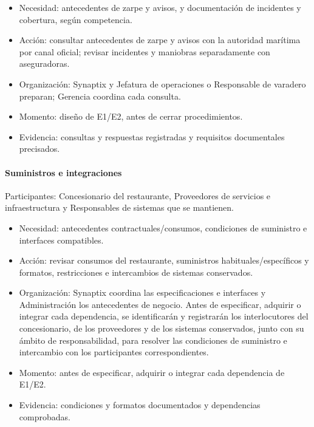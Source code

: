\begin{itemize}
  \setlength{\itemsep}{2pt}
  \setlength{\parsep}{0pt}
  \item Necesidad: antecedentes de zarpe y avisos, y documentación de incidentes y cobertura, según competencia.
  \item Acción: consultar antecedentes de zarpe y avisos con la autoridad marítima por canal oficial; revisar incidentes y maniobras separadamente con aseguradoras.
  \item Organización: Synaptix y Jefatura de operaciones o Responsable de varadero preparan; Gerencia coordina cada consulta.
  \item Momento: diseño de E1/E2, antes de cerrar procedimientos.
  \item Evidencia: consultas y respuestas registradas y requisitos documentales precisados.
\end{itemize}

\paragraph{Suministros e integraciones}
\mbox{}\par
\noindent Participantes: Concesionario del restaurante, Proveedores de servicios e infraestructura y Responsables de sistemas que se mantienen.

\begin{itemize}
  \setlength{\itemsep}{2pt}
  \setlength{\parsep}{0pt}
  \item Necesidad: antecedentes contractuales/consumos, condiciones de suministro e interfaces compatibles.
  \item Acción: revisar consumos del restaurante, suministros habituales/específicos y formatos, restricciones e intercambios de sistemas conservados.
  \item Organización: Synaptix coordina las especificaciones e interfaces y Administración los antecedentes de negocio. Antes de especificar, adquirir o integrar cada dependencia, se identificarán y registrarán los interlocutores del concesionario, de los proveedores y de los sistemas conservados, junto con su ámbito de responsabilidad, para resolver las condiciones de suministro e intercambio con los participantes correspondientes.
  \item Momento: antes de especificar, adquirir o integrar cada dependencia de E1/E2.
  \item Evidencia: condiciones y formatos documentados y dependencias comprobadas.
\end{itemize}

